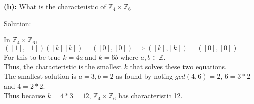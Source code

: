\documentclass{article} %
\begin{document}
\textbf{(b):} What is the characteristic of $\mathbb{Z}_4 \times \mathbb{Z}_6$
\\
\begin{addmargin}[1em]{0em}
\underline{Solution}:
\begin{addmargin}[1em]{0em}
In $\mathbb{Z}_4 \times \mathbb{Z}_6$, $([1],[1])([k][k]) = ([0],[0]) \implies ([k],[k]) = ([0], [0])$
\\For this to be true $k = 4a$ and $k = 6b$ where $a, b \in \mathbb{Z}$.
\\Thus, the characteristic is the smallest $k$ that solves these two equations.
\\The smallest solution is $a = 3, b = 2$ as found by noting $gcd(4, 6) = 2$, $6 = 3 * 2$ and $4 = 2 * 2$.
\\Thus because $k = 4 * 3 = 12$, $\mathbb{Z}_4 \times \mathbb{Z}_6$ has characteristic 12.
\end{addmargin}
\end{addmargin}

\newpage
\end{document}
